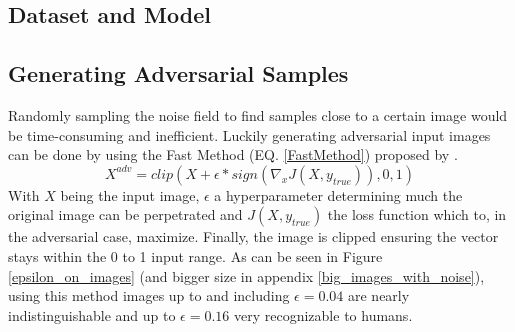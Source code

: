 \subsection{Dataset and Model}



\subsection{Generating Adversarial Samples}
Randomly sampling the noise field to find samples close to a certain image would be time-consuming and inefficient. Luckily generating adversarial input images can be done by using the Fast Method (EQ. \ref{FastMethod}) proposed by \citeauthor{goodfellow2015explaining}.
\begin{equation}
    X^{adv} = clip(X + \epsilon * sign(\nabla_{x}J(X, y_{true})), 0, 1)
    \label{FastMethod}
\end{equation}
With $X$ being the input image, $\epsilon$ a hyperparameter determining much the original image can be perpetrated and $J(X, y_{true})$ the loss function which to, in the adversarial case, maximize. Finally, the image is clipped ensuring the vector stays within the 0 to 1 input range. As can be seen in Figure \ref{epsilon_on_images} (and bigger size in appendix \ref{big_images_with_noise}), using this method images up to and including $\epsilon=0.04$ are nearly indistinguishable and up to $\epsilon=0.16$ very recognizable to humans.

